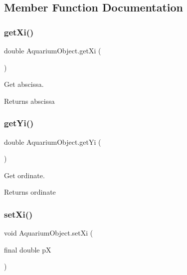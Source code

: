 \subsection{Member Function Documentation}
\mbox{\label{class_aquarium_object_a020f612b6195b3332a4bb602f9f098be}} 
\subsubsection{\texorpdfstring{get\+Xi()}{getXi()}}
{\footnotesize\ttfamily double Aquarium\+Object.\+get\+Xi (\begin{DoxyParamCaption}{ }\end{DoxyParamCaption})\hspace{0.3cm}{\ttfamily [inline]}}

Get abscissa.

\begin{DoxyReturn}{Returns}
abscissa 
\end{DoxyReturn}
\mbox{\label{class_aquarium_object_acc1d2d6ed24f6802eaded313d25785a8}} 
\subsubsection{\texorpdfstring{get\+Yi()}{getYi()}}
{\footnotesize\ttfamily double Aquarium\+Object.\+get\+Yi (\begin{DoxyParamCaption}{ }\end{DoxyParamCaption})\hspace{0.3cm}{\ttfamily [inline]}}

Get ordinate.

\begin{DoxyReturn}{Returns}
ordinate 
\end{DoxyReturn}
\mbox{\label{class_aquarium_object_a5ab79d2c1c8eb52e0857b734803a7385}} 
\subsubsection{\texorpdfstring{set\+Xi()}{setXi()}}
{\footnotesize\ttfamily void Aquarium\+Object.\+set\+Xi (\begin{DoxyParamCaption}\item[{final double}]{pX }\end{DoxyParamCaption})\hspace{0.3cm}{\ttfamily [inline]}}

